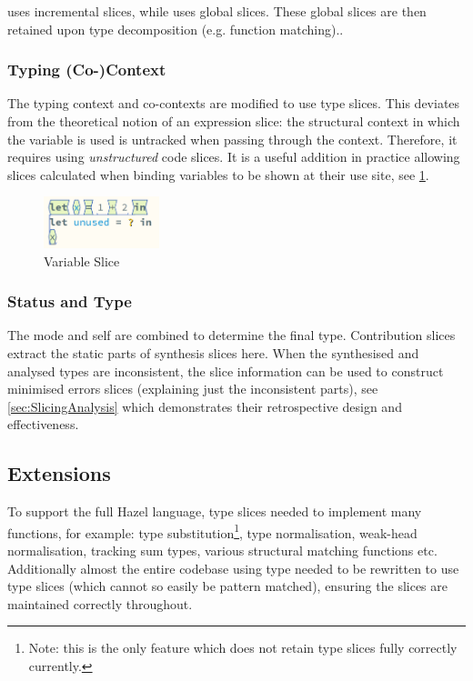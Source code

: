  uses incremental slices, while  uses global slices. These global slices are then retained upon type decomposition (e.g. function matching)..

\subsubsection{Typing (Co-)Context}
The typing context and co-contexts are modified to use type slices. This deviates from the theoretical notion of an expression slice: the structural context in which the variable is used is untracked when passing through the context. Therefore, it requires using \textit{unstructured} code slices. It is a useful addition in practice allowing slices calculated when binding variables to be shown at their use site, see \cref{fig:VarSlice}.
\begin{figure}[h]
\centering
\includegraphics[width=0.3\textwidth]{Media/Figures/var_slice}
\caption{Variable Slice}
\label{fig:VarSlice}
\end{figure}

\subsubsection{Status and Type}
The mode and self are combined to determine the final type. Contribution slices extract the static parts of synthesis slices here. When the synthesised and analysed types are inconsistent, the slice information can be used to construct minimised errors slices (explaining just the inconsistent parts), see \cref{sec:SlicingAnalysis} which demonstrates their retrospective design and effectiveness.

\subsection{Extensions}
To support the full Hazel language, type slices needed to implement many functions, for example: type substitution\footnote{Note: this is the only feature which does not retain type slices fully correctly currently.}, type normalisation, weak-head normalisation, tracking sum types, various structural matching functions etc. Additionally almost the entire codebase using type needed to be rewritten to use type slices (which cannot so easily be pattern matched), ensuring the slices are maintained correctly throughout.

